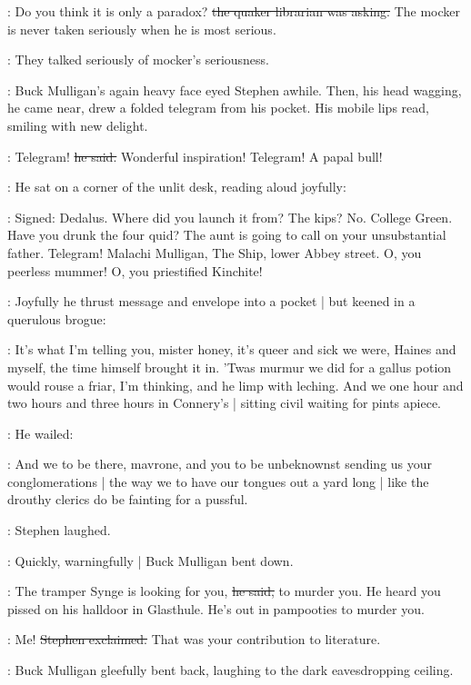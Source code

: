 \librarian:
Do you think it is only a paradox?
\sout{the quaker librarian was asking.}
The mocker is never taken seriously when he is most serious.

:
They talked seriously of mocker's seriousness.

:
Buck Mulligan's again heavy face eyed Stephen awhile.
Then,
his head wagging,
he came near,
drew a folded telegram from his pocket.
His mobile lips read,
smiling with new delight.

\mulligan:
Telegram!
\sout{he said.}
Wonderful inspiration!
Telegram!
A papal bull!

:
He sat on a corner of the unlit desk,
reading aloud joyfully:

\mulligan:
Signed: Dedalus.
Where did you launch it from?
The kips?
No.
College Green.
Have you drunk the four quid?
The aunt is going to call on your unsubstantial father.
Telegram!
Malachi Mulligan, The Ship, lower Abbey street.
O, you peerless mummer!
O, you priestified Kinchite!

:
Joyfully
he thrust message and envelope into a pocket |
but keened in a querulous brogue:

\mulligan:
It's what I'm telling you,
mister honey,
it's queer and sick we were,
Haines and myself,
the time himself brought it in.
'Twas murmur we did for a gallus potion would rouse a friar,
I'm thinking,
and he limp with leching.
And we one hour and two hours and three hours in Connery's |
sitting civil waiting for pints apiece.

:
He wailed:

\mulligan:
And we to be there,
mavrone,
and you to be unbeknownst sending us your conglomerations |
the way we to have our tongues out a yard long |
like the drouthy clerics do be fainting for a pussful.

:
Stephen laughed.

:
Quickly, warningfully |
Buck Mulligan bent down.

\mulligan:
The tramper Synge is looking for you,
\sout{he said,}
to murder you.
He heard you pissed on his halldoor in Glasthule.
He's out in pampooties to murder you.

\Stephen:
Me!
\sout{Stephen exclaimed.}
That was your contribution to literature.

:
Buck Mulligan gleefully bent back,
laughing to the dark eavesdropping ceiling.

